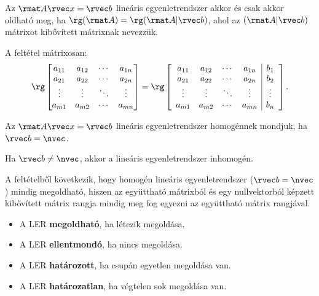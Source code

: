 \documentclass[a4paper, 12pt]{scrartcl}
\begin{document}
\begin{theorem}
  Az $\rmat A \rvec x = \rvec b$ lineáris egyenletrendszer akkor és csak
  akkor oldható meg, ha $\rg(\rmat A) = \rg(\rmat A | \rvec b)$, ahol az
  $(\rmat A | \rvec b)$ mátrixot kibővített mátrixnak nevezzük.

  A feltétel mátrixosan:
  $$
    \rg \begin{bmatrix}
      a_{11} & a_{12} & \cdots & a_{1n} \\
      a_{21} & a_{22} & \cdots & a_{2n} \\
      \vdots & \vdots & \ddots & \vdots \\
      a_{m1} & a_{m2} & \cdots & a_{mn}
    \end{bmatrix} = \rg \left[\begin{array}{cccc|c}
        a_{11} & a_{12} & \cdots & a_{1n} & b_1    \\
        a_{21} & a_{22} & \cdots & a_{2n} & b_2    \\
        \vdots & \vdots & \ddots & \vdots & \vdots \\
        a_{m1} & a_{m2} & \cdots & a_{mn} & b_n
      \end{array}\right]\text.
  $$
\end{theorem}

\begin{definition}
  Az $\rmat A \rvec x = \rvec b$ lineáris egyenletrendszer homogénnek mondjuk,
  ha $\rvec b = \nvec$.

  Ha $\rvec b \neq \nvec$, akkor a lineáris egyenletrendszer inhomogén.
\end{definition}

\begin{note}
  A feltételből következik, hogy homogén lineáris egyenletrendszer
  ($\rvec b = \nvec$) mindig megoldható, hiszen az együttható mátrixból és egy
  nullvektorból képzett kibővített mátrix rangja mindig meg fog egyezni az
  együttható mátrix rangjával.
\end{note}

\begin{blueBox}

  \begin{itemize}
    \item A LER \textbf{megoldható}, ha létezik megoldása.

    \item A LER \textbf{ellentmondó}, ha nincs megoldása.

    \item A LER \textbf{határozott}, ha csupán egyetlen megoldása van.

    \item A LER \textbf{határozatlan}, ha végtelen sok megoldása van.
  \end{itemize}
\end{blueBox}
\end{document}
